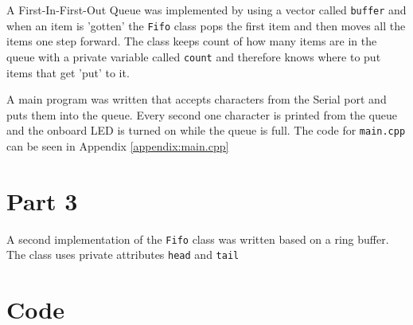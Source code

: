 \documentclass{article}
\begin{document}
A First-In-First-Out Queue was implemented by using a vector called \verb"buffer" and when an item is 'gotten' the \verb"Fifo" class pops the first item and then moves all the items one step forward. The class keeps count of how many items are in the queue with a private variable called \verb"count" and therefore knows where to put items that get 'put' to it.




A main program was written that accepts characters from the Serial port and puts them into the queue. Every second one character is printed from the queue and the onboard LED is turned on while the queue is full. The code for \verb!main.cpp! can be seen in Appendix \ref{appendix:main.cpp}

\section*{Part 3}
A second implementation of the \verb!Fifo! class was written based on a ring buffer. The class uses private attributes \verb"head" and \verb"tail" 
\newpage
\appendix
\section{Code}\label{appendix:code}

%








\end{document}
